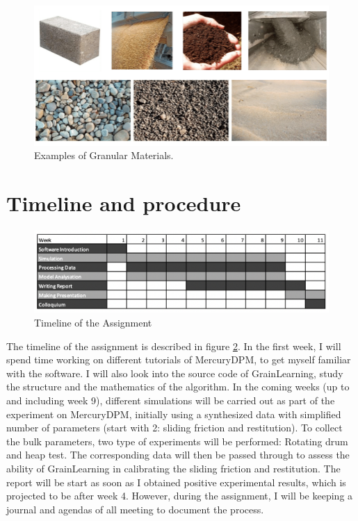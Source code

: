 \documentclass{article}
\begin{document}
\begin{figure}
    \centering
    \includegraphics[scale=0.5]{granularExample.png}
    \caption{Examples of Granular Materials.\cite{granularExample}}
    \label{fig:granularExample}
\end{figure}

\section{Timeline and procedure}
\begin{figure}
    \centering
    \includegraphics[scale=0.8]{timeline.png}
    \caption{Timeline of the Assignment}
    \label{fig:timeline}
\end{figure}

The timeline of the assignment is described in figure \ref{fig:timeline}. In the first week, I will spend time working on different tutorials of MercuryDPM, to get myself familiar with the software. I will also look into the source code of GrainLearning, study the structure and the mathematics of the algorithm. In the coming weeks (up to and including week 9), different simulations will be carried out as part of the experiment on MercuryDPM, initially using a synthesized data with simplified number of parameters (start with 2: sliding friction and restitution). To collect the bulk parameters, two type of experiments will be performed: Rotating drum and heap test. The corresponding data will then be passed through to assess the ability of GrainLearning in calibrating the sliding friction and restitution. The report will be start as soon as I obtained positive experimental results, which is projected to be after week 4. However, during the assignment, I will be keeping a journal and agendas of all meeting to document the process.  

\pagebreak


\end{document}
